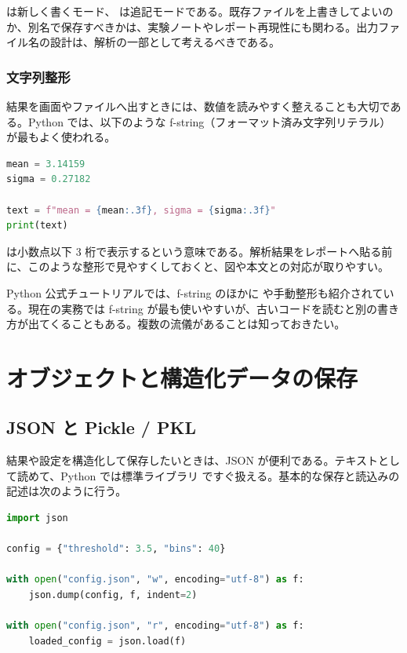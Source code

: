  は新しく書くモード、 は追記モードである。既存ファイルを上書きしてよいのか、別名で保存すべきかは、実験ノートやレポート再現性にも関わる。出力ファイル名の設計は、解析の一部として考えるべきである。

\subsubsection{文字列整形}

結果を画面やファイルへ出すときには、数値を読みやすく整えることも大切である。Python では、以下のような f-string（フォーマット済み文字列リテラル）が最もよく使われる。

\begin{lstlisting}[language=Python]
mean = 3.14159
sigma = 0.27182

text = f"mean = {mean:.3f}, sigma = {sigma:.3f}"
print(text)
\end{lstlisting}

 は小数点以下 3 桁で表示するという意味である。解析結果をレポートへ貼る前に、このような整形で見やすくしておくと、図や本文との対応が取りやすい。

Python 公式チュートリアルでは、f-string のほかに  や手動整形も紹介されている。現在の実務では f-string が最も使いやすいが、古いコードを読むと別の書き方が出てくることもある。複数の流儀があることは知っておきたい。

\section{オブジェクトと構造化データの保存}

\subsection{JSON と Pickle / PKL}

結果や設定を構造化して保存したいときは、JSON が便利である。テキストとして読めて、Python では標準ライブラリ  ですぐ扱える。基本的な保存と読込みの記述は次のように行う。

\begin{lstlisting}[language=Python]
import json

config = {"threshold": 3.5, "bins": 40}

with open("config.json", "w", encoding="utf-8") as f:
    json.dump(config, f, indent=2)

with open("config.json", "r", encoding="utf-8") as f:
    loaded_config = json.load(f)
\end{lstlisting}

